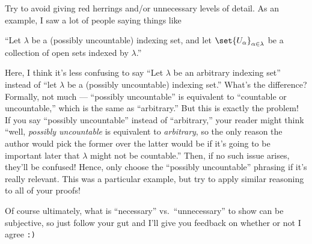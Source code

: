 \documentclass{fkpset}
\begin{document}
\begin{problem}[A3]
  Try to avoid giving red herrings and/or unnecessary levels of detail. As an
  example, I saw a lot of people saying things like
  \begin{leftbar}
    ``Let $\lambda$ be a (possibly uncountable) indexing set, and let
    $\set{U_\alpha}_{\alpha \in \lambda}$ be a collection of open sets indexed
    by $\lambda$.''
  \end{leftbar}
  Here, I think it's less confusing to say ``Let $\lambda$ be an arbitrary
  indexing set'' instead of ``let $\lambda$ be a (possibly uncountable) indexing
  set.'' What's the difference? Formally, not much --- ``possibly uncountable''
  is equivalent to ``countable or uncountable,'' which is the same as
  ``arbitrary.'' But this is exactly the problem!\\

  If you say ``possibly uncountable'' instead of ``arbitrary,'' your reader
  might think ``well, \emph{possibly uncountable} is equivalent to
  \emph{arbitrary}, so the only reason the author would pick the former over the
  latter would be if it's going to be important later that $\lambda$ might not
  be countable.'' Then, if no such issue arises, they'll be confused! Hence,
  only choose the ``possibly uncountable'' phrasing if it's really relevant.
  This was a particular example, but try to apply similar reasoning to all of
  your proofs!

  Of course ultimately, what is ``necessary'' vs.\ ``unnecessary'' to show can
  be subjective, so just follow your gut and I'll give you feedback on whether
  or not I agree \texttt{:)}



\end{problem}
\end{document}
